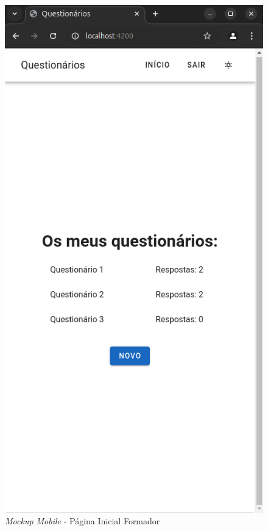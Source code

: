 \documentclass[12pt,a4paper,final]{article}
\begin{document}
    \begin{figure}[H]
        \centering
        \includegraphics[width=\textwidth,height=0.9\textheight,keepaspectratio]{mockups/questionarios.wireframes-formador-geral-mobile}
        \caption{\textit{Mockup Mobile} - Página Inicial Formador}
        \label{fig:mm-pif}
    \end{figure}
\end{document}
